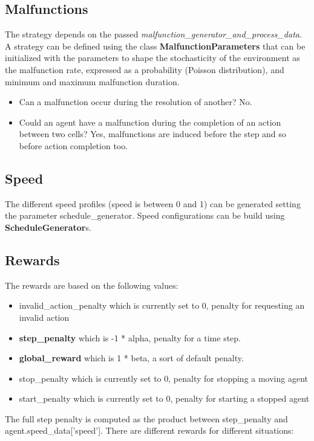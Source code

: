 \documentclass[11pt, a4paper, hidelinks]{report}
\begin{document}
\subsection{Malfunctions}\label{subsec:malfunctions}
The strategy depends on the passed \textit{malfunction\_generator\_and\_process\_data}.
A strategy can be defined using the class \textbf{MalfunctionParameters} that can be initialized with the parameters to shape the stochasticity of the environment as the malfunction rate, expressed as a probability (Poisson distribution), and minimum and maximum malfunction duration.

\begin{itemize}
	\item Can a malfunction occur during the resolution of another?
No.
	\item Could an agent have a malfunction during the completion of an action between two cells?
Yes, malfunctions are induced before the step and so before action completion too.
\end{itemize}

\subsection{Speed}\label{subsec:speed}
The different speed profiles (speed is between 0 and 1) can be generated setting the parameter schedule\_generator.
Speed configurations can be build using \textbf{ScheduleGenerator}s.

\subsection{Rewards}\label{subsec:rewards}
The rewards are based on the following values:
\begin{itemize}
	\item invalid\_action\_penalty which is currently set to 0, penalty for requesting an invalid action
	\item \textbf{step\_penalty} which is -1 * alpha, penalty for a time step.
	\item \textbf{global\_reward} which is 1 * beta, a sort of default penalty.
	\item stop\_penalty which is currently set to 0, penalty for stopping a moving agent
	\item start\_penalty which is currently set to 0, penalty for starting a stopped agent
\end{itemize}

The full step penalty is computed as the product between step\_penalty and \\ agent.speed\_data['speed'].
There are different rewards for different situations:
\end{document}
